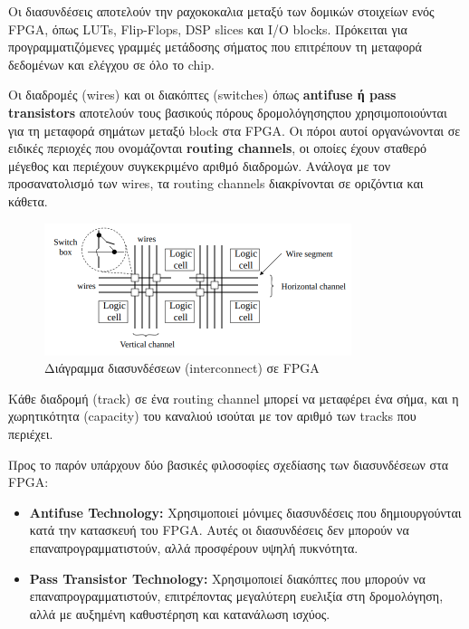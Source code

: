 Οι διασυνδέσεις αποτελούν την ραχοκοκαλια μεταξύ των δομικών στοιχείων ενός FPGA, όπως LUTs, Flip-Flops, DSP slices και I/O blocks. Πρόκειται για προγραμματιζόμενες γραμμές μετάδοσης σήματος που επιτρέπουν τη μεταφορά δεδομένων και ελέγχου σε όλο το chip.

Οι διαδρομές (wires) και οι διακόπτες (switches) όπως \textbf{antifuse ή pass transistors} αποτελούν τους βασικούς πόρους δρομολόγησηςπου χρησιμοποιούνται για τη μεταφορά σημάτων μεταξύ block στα FPGA. Οι πόροι αυτοί οργανώνονται σε ειδικές περιοχές που ονομάζονται \textbf{routing channels}, οι οποίες έχουν σταθερό μέγεθος και περιέχουν συγκεκριμένο αριθμό διαδρομών. Ανάλογα με τον προσανατολισμό των wires, τα routing channels διακρίνονται σε οριζόντια και κάθετα.

\begin{figure}[h!]
  \centering
  \includegraphics[width=0.8\textwidth]{figures/chapter3/interconnect.png}
  \caption{Διάγραμμα διασυνδέσεων (interconnect) σε FPGA}
  \label{fig:interconnect}
\end{figure}

Κάθε διαδρομή (track) σε ένα routing channel μπορεί να μεταφέρει ένα σήμα, και η χωρητικότητα (capacity) του καναλιού ισούται με τον αριθμό των tracks που περιέχει.

Προς το παρόν υπάρχουν δύο βασικές φιλοσοφίες σχεδίασης των διασυνδέσεων στα FPGA:
\begin{itemize}
  \item \textbf{Antifuse Technology:} Χρησιμοποιεί μόνιμες διασυνδέσεις που δημιουργούνται κατά την κατασκευή του FPGA. Αυτές οι διασυνδέσεις δεν μπορούν να επαναπρογραμματιστούν, αλλά προσφέρουν υψηλή πυκνότητα.
  \item \textbf{Pass Transistor Technology:} Χρησιμοποιεί διακόπτες που μπορούν να επαναπρογραμματιστούν, επιτρέποντας μεγαλύτερη ευελιξία στη δρομολόγηση, αλλά με αυξημένη καθυστέρηση και κατανάλωση ισχύος.
\end{itemize}

